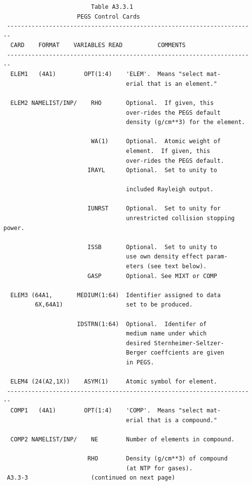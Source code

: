 \newpage {} \begin{verbatim}
                         Table A3.3.1
                     PEGS Control Cards
 -----------------------------------------------------------------------
  CARD    FORMAT    VARIABLES READ          COMMENTS
 -----------------------------------------------------------------------
  ELEM1   (4A1)        OPT(1:4)    'ELEM'.  Means "select mat-
                                   erial that is an element."

  ELEM2 NAMELIST/INP/    RHO       Optional.  If given, this
                                   over-rides the PEGS default
                                   density (g/cm**3) for the element.

                         WA(1)     Optional.  Atomic weight of
                                   element.  If given, this
                                   over-rides the PEGS default.
                        IRAYL      Optional.  Set to unity to

                                   included Rayleigh output.

                        IUNRST     Optional.  Set to unity for
                                   unrestricted collision stopping power.

                        ISSB       Optional.  Set to unity to
                                   use own density effect param-
                                   eters (see text below).
                        GASP       Optional. See MIXT or COMP

  ELEM3 (64A1,       MEDIUM(1:64)  Identifier assigned to data
         6X,64A1)                  set to be produced.

                     IDSTRN(1:64)  Optional.  Identifer of
                                   medium name under which
                                   desired Sternheimer-Seltzer-
                                   Berger coeffcients are given
                                   in PEGS.

  ELEM4 (24(A2,1X))    ASYM(1)     Atomic symbol for element.
 -----------------------------------------------------------------------
  COMP1   (4A1)        OPT(1:4)    'COMP'.  Means "select mat-
                                   erial that is a compound."

  COMP2 NAMELIST/INP/    NE        Number of elements in compound.

                        RHO        Density (g/cm**3) of compound
                                   (at NTP for gases).
 A3.3-3                  (continued on next page)
\end{verbatim}
